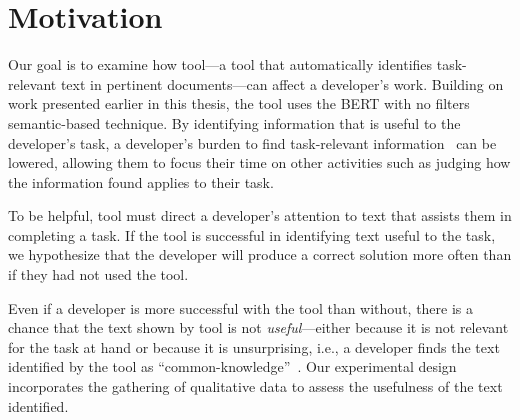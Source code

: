


\section{Motivation}
\label{cp6:method}



Our goal is to examine how \acs{tool}---a tool that 
automatically identifies
task-relevant text in pertinent
documents---can affect a developer's work.
Building on work presented earlier in this
thesis, the tool  uses the BERT with no filters semantic-based technique.
By identifying information that is useful to the developer's task,
a developer's burden to find task-relevant information~\cite{Robillard2015}
can be lowered,
allowing them to focus their time on other activities such as judging how the information found applies to their task.


To be helpful, \acs{tool} must direct a developer's attention to text that assists them in completing a task.
If the tool is successful in identifying text useful to the task, we hypothesize that
the developer will produce a correct solution more often than if they had not used the tool.


Even if a developer is more successful
with the tool than without, there is a chance that the text shown by \acs{tool} is not \textit{useful}---either because it is not relevant for the task at hand or because it is unsurprising, i.e.,
a developer finds the text identified by the tool as ``common-knowledge''~\cite{cwalina2008, Robillard2015}. Our experimental design incorporates the gathering of qualitative data to assess the usefulness of the text identified.

 

